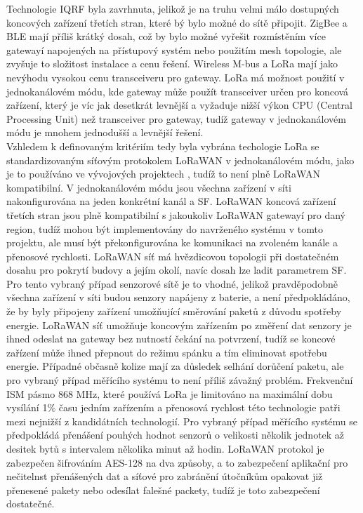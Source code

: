
Technologie IQRF byla zavrhnuta, jelikož je na truhu velmi málo dostupných koncových zařízení třetích stran, které bý bylo možné do sítě připojit. 
ZigBee a BLE mají příliš krátký dosah, což by bylo možné vyřešit rozmístěním více gatewayí napojených na přístupový systém nebo použitím mesh topologie, ale zvyšuje to složitost instalace a cenu řešení. 
Wireless M-bus a LoRa mají jako nevýhodu vysokou cenu transceiveru pro gateway. 
LoRa má možnost použití v jednokanálovém módu, kde gateway může použít transceiver určen pro koncová zařízení, který je víc jak desetkrát levnější a vyžaduje nižší výkon CPU (Central Processing Unit) než transceiver pro gateway, tudíž gateway v jednokanálovém módu je mnohem jednodušší a levnější řešení.
\\
Vzhledem k definovaným kritériím tedy byla vybrána techologie LoRa se standardizovaným síťovým protokolem LoRaWAN v jednokanálovém módu, jako je to používáno ve vývojových projektech \cite{Analysis of Propagation Link for Remote Weather}, tudíž to není plně LoRaWAN kompatibilní.
V jednokanálovém módu jsou všechna zařízení v síti nakonfigurována na jeden konkrétní kanál a SF.
LoRaWAN koncová zařízení třetích stran jsou plně kompatibilní s jakoukoliv LoRaWAN gatewayí pro daný region, tudíž mohou být implementovány do navrženého systému v tomto projektu, ale musí být překonfigurována ke komunikaci na zvoleném kanále a přenosové rychlosti. 
LoRaWAN síť má hvězdicovou topologii při dostatečném dosahu pro pokrytí budovy a jejím okolí, navíc dosah lze ladit parametrem SF. Pro tento vybraný případ senzorové sítě je to vhodné, jelikož pravděpodobně všechna zařízení v síti budou senzory napájeny z baterie, a není předpokládáno, že by byly připojeny zařízení umožňující směrování paketů z důvodu spotřeby energie. 
LoRaWAN síť umožňuje koncovým zařízením po změření dat senzory je ihned odeslat na gateway bez nutností čekání na potvrzení, tudíž se koncové zařízení může ihned přepnout do režimu spánku a tím eliminovat spotřebu energie. 
Případné občasně kolize mají za důsledek selhání dorůčení paketu, ale pro vybraný případ měřícího systému to není příliš závažný problém.
Frekvenční ISM pásmo 868 MHz, které používá LoRa je limitováno na maximální dobu vysílání 1\% času jedním zařízením a přenosová rychlost této technologie patři mezi nejnižší z kandidátních technologií. 
Pro vybraný případ měřícího systému se předpokládá přenášení pouhých hodnot senzorů o velikosti několik jednotek až desitek bytů s intervalem několika minut až hodin.
LoRaWAN protokol je zabezpečen šifrováním AES-128 na dva způsoby, a to zabezpečení aplikační pro nečitelnst přenášených dat a síťové pro zabránění útočníkům opakovat již přenesené pakety nebo odesílat falešné packety, tudíž je toto zabezpečení dostatečné. 

